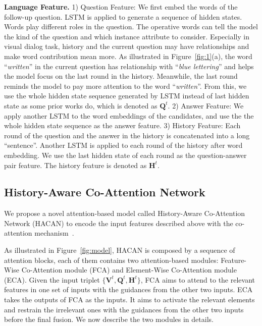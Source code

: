 \documentclass[10pt,twocolumn,letterpaper]{article}
\begin{document}
\noindent\textbf{Language Feature.} 1) Question Feature: We first embed the words of the follow-up question.  LSTM is applied to generate a sequence of hidden states. Words play different roles in the question. The operative words can tell the model the kind of the question and which instance attribute to consider. Especially in visual dialog task, history and the current question may have relationships and make word contribution mean more. As illustrated in Figure~\ref{fig:1}(a), the word ``\emph{written}'' in the current question has relationship with ``\emph{blue lettering}'' and helps the model focus on the last round in the history. Meanwhile, the last round reminds the model to pay more attention to the word ``\emph{written}''. From this, we use the whole hidden state sequence generated by LSTM instead of last hidden state as some prior works do, which is denoted as $\bm{Q}^t$. 2) Answer Feature: We apply another LSTM to the word embeddings of the candidates, and use the the whole hidden state sequence as the answer feature. 3) History Feature: Each round of the question and the answer in the history is concatenated into a long ``sentence''. Another LSTM is applied to each round of the history after word embedding. We use the last hidden state of each round as the question-answer pair feature. The history feature is denoted as $\bm{H}^{t}$.



\subsection{History-Aware Co-Attention Network}\label{sec:3.2}
We propose a novel attention-based model called History-Aware Co-Attention Network (HACAN) to encode the input features described above with the co-attention mechanism~\cite{wu2017you,lu2017best,lu2016hierarchical}. 

As illustrated in Figure~\ref{fig:model}, HACAN is composed by a sequence of attention blocks,  each of them contains two attention-based modules: Feature-Wise Co-Attention module (FCA) and Element-Wise Co-Attention module (ECA). Given the input triplet $\{\bm{V}^t, \bm{Q}^t, \bm{H}^{t}\}$, FCA aims to attend to the relevant features in one set of inputs with the guidances from the other two inputs. ECA takes the outputs of FCA as the inputs. It aims to activate the relevant elements and restrain the irrelevant ones with the guidances from the other two inputs before the final fusion. We now describe the two modules in details. 
\end{document}
